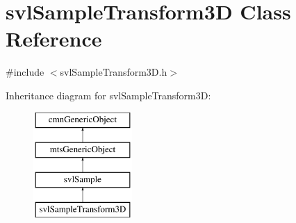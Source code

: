 \hypertarget{classsvl_sample_transform3_d}{\section{svl\-Sample\-Transform3\-D Class Reference}
\label{classsvl_sample_transform3_d}
}


{\ttfamily \#include $<$svl\-Sample\-Transform3\-D.\-h$>$}

Inheritance diagram for svl\-Sample\-Transform3\-D\-:\begin{figure}[H]
\begin{center}
\leavevmode
\includegraphics[height=4.000000cm]{d0/df2/classsvl_sample_transform3_d}
\end{center}
\end{figure}
